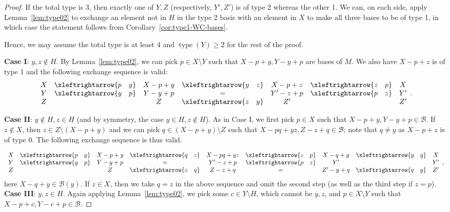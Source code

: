 \documentclass{amsart}
\newcommand{\swap}[2]{\xleftrightarrow{#1 \quad #2}}
\newcommand\Bcal{{\mathcal B}}
\DeclareMathOperator{\type}{type}
\begin{document}
\begin{proof}
If the total type is 3, then exactly one of $Y,Z$ (respectively, $Y', Z'$) is of type 2 whereas the other 1. We can, on each side, apply Lemma~\ref{lem:type02} to exchange an element not in $H$ in the type 2 basis with an element in $X$ to make all three bases to be of type 1, in which case the statement follows from Corollary~\ref{cor:type1-WC-bases}.

Hence, we may assume the total type is at least 4 and $\type (Y)\geq 2$ for the rest of the proof.

{\bf Case I}: $y,z\not\in H$. By Lemma~\ref{lem:type02}, we can pick $p\in X \setminus Y$ such that $X - p + y , Y - y + p$ are bases of $M$. We also have $X-p+z$ is of type 1 and the following exchange sequence is valid:
$$
        \begin{array}{c c c c c c c}
           X   & \swap{p}{y} & X - p + y & \swap{y}{z} & X - p + z & \swap{z}{p} & X \\
           Y   & \swap{y}{p} & Y - y + p &   =        & Y' - z + p & \swap{p}{z} & Y' \\
           Z   &             & Z         & \swap{z}{y} & Z'         &             & Z'
        \end{array}.
$$

{\bf Case II}: $y \not\in H, z \in H$ (and by symmetry, the case $y \in H, z \not\in H$). As in Case I, we first pick $p\in X$ such that $X - p + y , Y - y + p \in \Bcal$. If $z\not\in X$, then $z\in Z \setminus (X - p + y)$ and we can pick $q\in (X - p + y) \setminus Z$ such that $X-pq+yz, Z - z + q \in \Bcal$; note that $q\neq y$ as $X-p+z$ is of type 0. The following exchange sequence is thus valid.

$$
        \begin{array}{c c c c c c c c c}
           X   & \swap{p}{y} & X - p + y & \swap{q}{z} & X - pq + yz & \swap{z}{p} & X - q + y & \swap{y}{q} & X\\
           Y   & \swap{y}{p} & Y - y + p &      =      & Y' - z + p & \swap{p}{z} & Y'         &             & Y'\\
           Z   &             & Z         & \swap{z}{q} & Z - z + q & =            & Z' - y + q & \swap{q}{y} & Z'
        \end{array},
$$
here $X-q+y\in\Bcal(y)$. If $z\in X$, then we take $q=z$ in the above sequence and omit the second step (as well as the third step if $z=p$).\\

{\bf Case III}: $y, z \in H$. Again applying Lemma~\ref{lem:type02}, we pick some $c\in Y\setminus H$, which cannot be $y,z$, and $p\in X\setminus Y$ such that $X-p+c,Y-c+p\in\Bcal$.


\end{proof}
\end{document}
